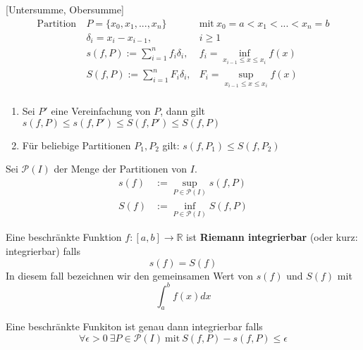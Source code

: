 \documentclass[8pt,a4paper,twocolumn,table]{extarticle}
\newcommand{\R}{\mathbb{R}}
\begin{document}
\begin{definition}{}[Untersumme, Obersumme]
    \begin{alignat*}{2}
        \mbox{Partition}\  & P = \{x_0, x_1, ..., x_n\}\           & \mbox{mit}\ x_0 = a < x_1 < ... < x_n = b \\
                           & \delta_i = x_i - x_{i - 1},           & i \ge 1                                   \\
                           & s(f, P) := \sum_{i=1}^n f_i \delta_i, & f_i = \inf_{x_{i - 1} \le x \le x_i} f(x) \\
                           & S(f, P) := \sum_{i=1}^n F_i \delta_i, & F_i = \sup_{x_{i - 1} \le x \le x_i} f(x) \\
    \end{alignat*}
\end{definition}

\begin{lemma}{5.2}
    \begin{enumerate}
        \item Sei $P'$ eine Vereinfachung von $P$, dann gilt $s(f, P) \le s(f, P') \le S(f, P') \le S(f, P)$
        \item Für beliebige Partitionen $P_1, P_2$ gilt: $s(f, P_1) \le S(f, P_2)$
    \end{enumerate}
\end{lemma}

\begin{definition}{}
    Sei $\mathcal{P}(I)$ der Menge der Partitionen von $I$.
    \begin{align*}
        s(f) & := \sup_{P \in \mathcal{P}(I)} s(f, P) \\
        S(f) & := \inf_{P \in \mathcal{P}(I)} S(f, P)
    \end{align*}
\end{definition}

\begin{satz}{5.3}
    Eine beschränkte Funktion $f: [a,b] \to \R$ ist \textbf{Riemann integrierbar} (oder kurz: integrierbar) falls
    \[ s(f) = S(f) \]
    In diesem fall bezeichnen wir den gemeinsamen Wert von $s(f)$ und $S(f)$ mit
    \[ \int_a^b f(x) dx \]
\end{satz}

\begin{satz}{5.4}
    Eine beschränkte Funkiton ist genau dann integrierbar falls
    \[ \forall \epsilon > 0\ \exists P \in \mathcal{P}(I)\ \mbox{mit}\ S(f, P) - s(f, P) \le \epsilon \]
\end{satz}
\end{document}
